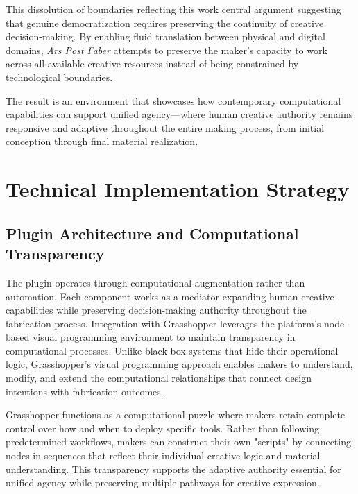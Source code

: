 \vspace{0.5cm}

This dissolution of boundaries reflecting this work central argument suggesting that genuine democratization requires preserving the continuity of creative decision-making. By enabling fluid translation between physical and digital domains, \textit{Ars Post Faber} attempts to preserve the maker's capacity to work across all available creative resources instead of being constrained by technological boundaries.

\vspace{0.5cm}

The result is an environment that showcases how contemporary computational capabilities can support unified agency—where human creative authority remains responsive and adaptive throughout the entire making process, from initial conception through final material realization.

\section{Technical Implementation Strategy}

\subsection{Plugin Architecture and Computational Transparency}

The plugin operates through computational augmentation rather than automation. Each component works as a mediator expanding human creative capabilities while preserving decision-making authority throughout the fabrication process. Integration with Grasshopper leverages the platform's node-based visual programming environment to maintain transparency in computational processes. Unlike black-box systems that hide their operational logic, Grasshopper's visual programming approach enables makers to understand, modify, and extend the computational relationships that connect design intentions with fabrication outcomes.

\vspace{0.5cm}

Grasshopper functions as a computational puzzle where makers retain complete control over how and when to deploy specific tools. Rather than following predetermined workflows, makers can construct their own "scripts" by connecting nodes in sequences that reflect their individual creative logic and material understanding. This transparency supports the adaptive authority essential for unified agency while preserving multiple pathways for creative expression.


